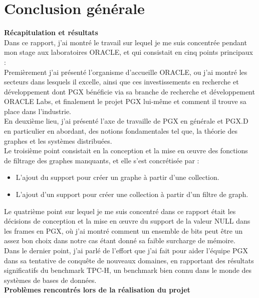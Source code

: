 \chapter*{Conclusion générale}
\textbf{Récapitulation et résultats}\\

Dans ce rapport, j'ai montré le travail sur lequel je me suis concentrée pendant mon stage aux laboratoires ORACLE, et qui consistait en cinq points principaux :\\
Premièrement j’ai présenté l’organisme d’accueille ORACLE, ou j’ai montré les secteurs dans lesquels il excelle, ainsi que ces investissements en recherche et développement dont PGX bénéficie via sa branche de recherche et développement ORACLE Labs, et finalement le projet PGX lui-même et comment il trouve sa place dans l’industrie.\\
En deuxième lieu, j’ai présenté l’axe de travaille de PGX en générale et PGX.D en particulier en abordant, des notions fondamentales tel que, la théorie des graphes et les systèmes distribuées.\\
Le troisième point consistait en la conception et la mise en œuvre des fonctions de filtrage des graphes manquants, et elle s'est concrétisée par : 
\begin{itemize}[label=\textbullet]
\item L’ajout du support pour créer un graphe à partir d'une collection.
\item L’ajout d'un support pour créer une collection à partir d'un filtre de graph.\\
\end{itemize}

Le quatrième point sur lequel je me suis concentré dans ce rapport était les décisions de conception et la mise en œuvre du support de la valeur NULL dans les frames en PGX, où j'ai montré comment un ensemble de bits peut être un assez bon choix dans notre cas étant donné sa faible surcharge de mémoire.\\
Dans le dernier point, j'ai parlé de l'effort que j'ai fait pour aider l'équipe PGX dans sa tentative de conquête de nouveaux domaines, en rapportant des résultats significatifs du benchmark TPC-H, un benchmark bien connu dans le monde des systèmes de bases de données.\\

\textbf{Problèmes rencontrés lors de la réalisation du projet}\\

